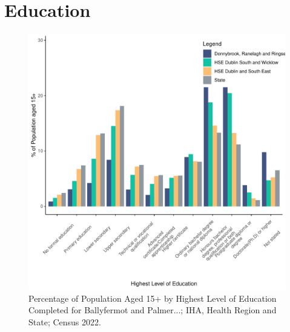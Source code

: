 \documentclass{article}
\begin{document}
\section{Education}\label{sect:Edu}
\begin{figure}[H]
	\centering
	\includegraphics[width = 120mm]{../figures/EduED.pdf}
	\caption{Percentage of Population Aged 15+ by Highest Level of Education Completed for Ballyfermot and Palmer...; IHA, Health Region and State; Census 2022.}
	\label{fig:vbnv}
	\end{figure}
\end{document}
